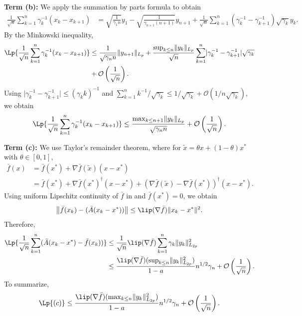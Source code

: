 \documentclass[11pt]{article}
\begin{document}
\textbf{Term (b):}
We apply the summation by parts formula to obtain
\begin{align*}
    \frac{1}{\sqrt{n}} \sum_{k=1}^n \gamma_k^{-1}(x_k - x_{k+1})
    &= \sqrt{\frac{1}{\gamma_1 n} } y_1 - \sqrt{\frac{1}{\gamma_{n+1}(n+1)}} y_{n+1} + \frac{1}{\sqrt{n}} \sum_{k=1}^n (\gamma_k^{-1} - \gamma_{k+1}^{-1})\sqrt{\gamma_k} y_k         .
\end{align*}
By the Minkowski inequality, 
\begin{align*}
    \Lp{\frac{1}{\sqrt{n}} \sum_{k=1}^n \gamma_k^{-1}(x_k - x_{k+1})}
    &
    \leq 
    \frac{1}{\sqrt{\gamma_n n}} \lVert y_{n+1} \rVert_{L_p} + 
    \frac{\sup_{k \leq n} \lVert y_k \rVert_{L_p}}{\sqrt{n}} \sum_{k=1}^n \lvert \gamma_k^{-1} - \gamma_{k+1}^{-1}\rvert \sqrt{\gamma_k} 
    \\ &
    + \mathcal{O}\left(\frac{1}{\sqrt{n}} \right) . 
\end{align*}
Using $\lvert \gamma_k^{-1} - \gamma_{k+1}^{-1} \rvert \leq (\gamma_k k)^{-1}$ and $\sum_{k=1}^n k^{-1}/\sqrt{\gamma_k} \leq 1/\sqrt{\gamma_k} + \mathcal{O}(1/n\sqrt{\gamma_k})$, we obtain
\begin{equation}\label{eq:pr_b_bound}
    \Lp{\frac{1}{\sqrt{n}} \sum_{k=1}^n \gamma_k^{-1}(x_k - x_{k+1})}
    \leq 
    \frac{\max_{k \leq n+1} \lVert y_k \rVert_{L_p}}{\sqrt{\gamma_n n}}
    + \mathcal{O}\left(\frac{1}{\sqrt{n}}\right) . 
\end{equation}

\textbf{Term (c):}
We use Taylor's remainder theorem, where for $\tilde{x} = \theta x + (1-\theta) x^*$ with $\theta \in [0, 1]$,
\begin{align*}
    \bar{f}(x) &= \bar{f}(x^*) + \nabla \bar{f}(\tilde{x}) (x - x^*)
    \\ &
    = \bar{f}(x^*) + \nabla \bar{f}(x^*)^\dagger (x - x^*)
    + (\nabla \bar{f}(\tilde{x}) - \nabla \bar{f}(x^*))^\dagger (x - x^*). 
\end{align*}
Using uniform Lipschitz continuity of $\bar{f}$ in  and $\bar{f}(x^*) = 0$, we obtain
\begin{equation}\label{eq:remainder_barf}
    \left\lVert \bar{f}(x_k) - (\bar{A}(x_k - x^*)) \right\rVert 
    \leq \lip(\nabla \bar{f}) \lVert x_k - x^* \rVert^2 .     
\end{equation}
Therefore,
\begin{align*}
    \Lp{\frac{1}{\sqrt{n}} \sum_{k=1}^n (\bar{A}(x_k - x^*) - \bar{f}(x_k))}
    &\leq 
    \frac{1}{\sqrt{n}}\lip(\nabla \bar{f}) \sum_{k=1}^n \gamma_k \lVert y_k \rVert_{L_{2p}}^2     
    \\ &
    \leq \frac{\lip(\nabla \bar{f}) (\sup_{k \leq n} \lVert y_k \rVert^2_{L_{2p}})}{1-a} n^{1/2} \gamma_n + \mathcal{O}\left(\frac{1}{\sqrt{n}}\right). 
\end{align*}
To summarize,
\begin{equation}\label{eq:pr_c_bound}
    \Lp{(c)} \leq 
    \frac{\lip(\nabla \bar{f}) (\max_{k \leq n} \lVert y_k \rVert^2_{L_{2p}})}{1-a} n^{1/2} \gamma_n + \mathcal{O}\left(\frac{1}{\sqrt{n}}\right). 
\end{equation}
\end{document}
